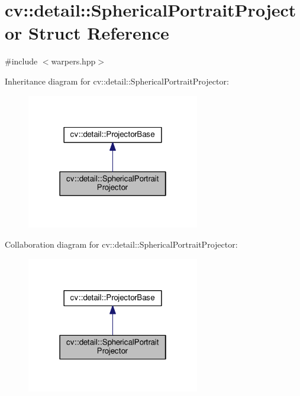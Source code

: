 \hypertarget{structcv_1_1detail_1_1SphericalPortraitProjector}{\section{cv\-:\-:detail\-:\-:Spherical\-Portrait\-Projector Struct Reference}
\label{structcv_1_1detail_1_1SphericalPortraitProjector}
}


{\ttfamily \#include $<$warpers.\-hpp$>$}



Inheritance diagram for cv\-:\-:detail\-:\-:Spherical\-Portrait\-Projector\-:\nopagebreak
\begin{figure}[H]
\begin{center}
\leavevmode
\includegraphics[width=214pt]{structcv_1_1detail_1_1SphericalPortraitProjector__inherit__graph}
\end{center}
\end{figure}


Collaboration diagram for cv\-:\-:detail\-:\-:Spherical\-Portrait\-Projector\-:\nopagebreak
\begin{figure}[H]
\begin{center}
\leavevmode
\includegraphics[width=214pt]{structcv_1_1detail_1_1SphericalPortraitProjector__coll__graph}
\end{center}
\end{figure}
